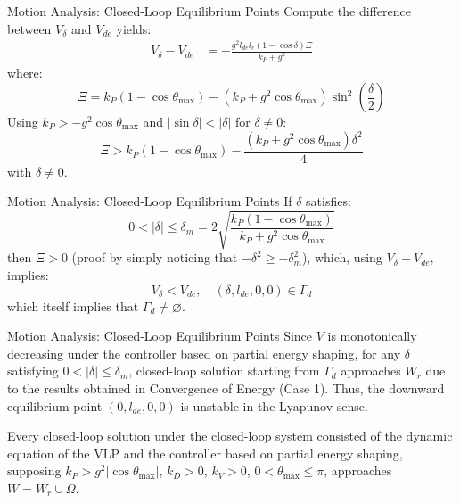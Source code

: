 \documentclass[10pt]{beamer}
\begin{document}
  \begin{frame}{Motion Analysis: Closed-Loop Equilibrium Points}
    Compute the difference between $V_\delta$ and $V_{de}$ yields:
    \begin{align*}
      V_\delta - V_{de} %
        &= -\frac{g^2 l_{de} l_r (1-\cos\delta) \Xi}{k_P+g^2}
    \end{align*}
    where:
    \begin{equation*}
        \Xi = k_P(1-\cos\theta_{\max})-(k_P+g^2\cos\theta_{\max})
            \sin^2 \left( \frac{\delta}{2} \right)
    \end{equation*}
    Using $k_P > -g^2\cos\theta_{\max}$ and
    $|\sin \delta|<|\delta|$ for $\delta \neq 0$:
    \begin{equation*}
      \Xi > k_P(1-\cos\theta_{\max})-
        \frac{(k_P+g^2\cos\theta_{\max})\delta^2}{4}
    \end{equation*}
    with $\delta \neq 0$.
  \end{frame}

  \begin{frame}{Motion Analysis: Closed-Loop Equilibrium Points}
    If $\delta$ satisfies:
    \begin{equation*}
      0 < |\delta| \le \delta_m = 2
        \sqrt{\frac{k_P(1-\cos\theta_{\max})}{k_P+g^2\cos\theta_{\max}}}
    \end{equation*}
    then $\Xi>0$ (proof by simply noticing that $-\delta^2\ge-\delta_m^2$),
    which, using $V_\delta - V_{de}$, implies:
    \begin{equation*}
      V_\delta < V_{de}, \quad (\delta, l_{de}, 0, 0) \in \Gamma_d
    \end{equation*}
    which itself implies%
    that $\Gamma_d \neq \varnothing$.
  \end{frame}

  \begin{frame}{Motion Analysis: Closed-Loop Equilibrium Points}
    Since $V$ is
    monotonically decreasing under the controller
    based on partial energy shaping, for any $\delta$
    satisfying $0 < |\delta| \le \delta_m$, closed-loop solution
    starting from $\Gamma_d$
    approaches $W_r$ due to the results obtained in
    Convergence of Energy (Case 1).
    Thus, the downward
    equilibrium point $(0, l_{de}, 0, 0)$ is unstable in the
    Lyapunov sense.

    Every closed-loop solution under the closed-loop
    system consisted of the dynamic equation of the VLP and the controller
    based on partial energy shaping, supposing
    $k_P>g^2|\cos\theta_{\max}|$, $k_D>0$, $k_V>0$,
    $0<\theta_{\max}\le\pi$, approaches $W=W_r\cup\Omega$.
  \end{frame}
\end{document}
